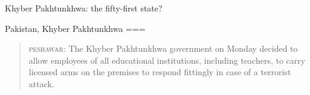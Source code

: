 Khyber Pakhtunkhwa: the fifty-first state?

Pakistan, Khyber Pakhtunkhwa
===
\begin{quote}
\textsc{peshawar}: The Khyber Pakhtunkhwa government on Monday decided to allow employees of all educational institutions, including teachers, to carry licensed arms on the premises to respond fittingly in case of a terrorist attack.
\end{quote}

\nocite{2015c}